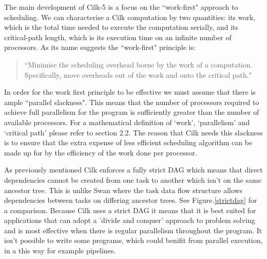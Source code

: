 The main development of Cilk-5 is a focus on the ``work-first" approach to scheduling. We can 
characterise a Cilk computation by two quantities: its work, which is the total time needed to execute the 
computation serially, and its critical-path length, which is its execution time on an infinite number of 
processors. As its name suggests the ``work-first" principle is: 

\begin{quote}
	``Minimise the scheduling overhead borne by the work of a computation. Specifically, move 
overheads out of the work and onto the critical path."
\end{quote}

In order for the work first principle to be effective we must assume that there is ample ``parallel 
slackness". This means that the number of processors required to achieve full parallelism for the program 
is sufficiently greater than the number of available processors. For a mathematical definition of `work', 
`parallelism' and `critical path' please refer to section 2.2. The reason that Cilk needs this slackness is to 
ensure that the extra expense of less efficient scheduling algorithm can be made up for by the efficiency 
of the work done per processor. 

As previously mentioned Cilk enforces a fully strict DAG which means that direct dependencies cannot be created from one task to another which isn't on the same ancestor tree. This is unlike Swan where the task data flow structure allows dependencies between tasks on differing ancestor trees. See Figure.\ref{strictdag} for a comparison. Because Cilk uses a strict DAG it means that it is best suited for applications that can adopt a 'divide and conquer' approach to problem solving and is most effective when there is regular parallelism throughout the program. It isn't possible to write some programs, which could benifit from parallel execution, in a this way for example pipelines.

